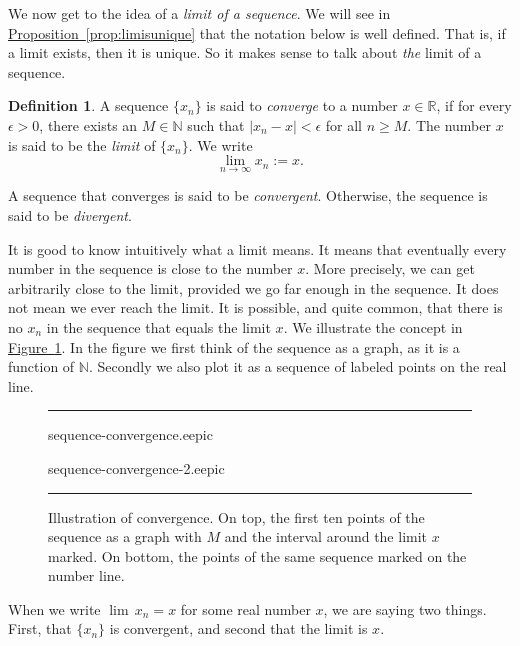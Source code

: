 \documentclass[12pt]{book}
\newenvironment{myfigureht}{%
\begin{figure}[h!t]
\noindent\rule{\textwidth}{0.4pt}\vspace{12pt}\par\centering}%
{\par\noindent\rule{\textwidth}{0.4pt}
\end{figure}}
\newcommand{\abs}[1]{\left\lvert {#1} \right\rvert}
\newcommand{\R}{{\mathbb{R}}}
\newcommand{\N}{{\mathbb{N}}}
\newcommand{\myindex}[1]{#1\index{#1}}
\theoremstyle{plain}
\theoremstyle{remark}
\theoremstyle{definition}
\newtheorem{defn}[thm]{Definition}
\theoremstyle{exercise}
\theoremstyle{example}
\newcommand{\figureref}[1]{\hyperref[#1]{Figure~\ref*{#1}}}
\newcommand{\propref}[1]{\hyperref[#1]{Proposition~\ref*{#1}}}
\begin{document}
We now get to the idea of a \emph{\myindex{limit of a sequence}}.  We will
see in \propref{prop:limisunique}
that the notation below is well defined.  That is, if a limit exists, then
it is unique.  So it makes sense to talk about \emph{the} limit of a sequence.

\begin{defn}
A sequence $\{ x_n \}$ is said to \emph{\myindex{converge}} to a number
$x \in \R$, if for every $\epsilon > 0$, there exists an $M \in \N$ such
that $\abs{x_n - x} < \epsilon$ for all $n \geq M$.  The number $x$
is said to be the \emph{limit} of $\{ x_n \}$.  We write
\begin{equation*}
\lim_{n\to \infty} x_n := x .
\end{equation*}

A sequence
that converges is said to be \emph{convergent}.
Otherwise, the sequence is said to be
\emph{divergent}.
\end{defn}

It is good to know intuitively what a limit means.  It means that eventually
every number in the sequence is close to the number $x$.  More precisely,
we can get arbitrarily close to the limit, provided we go far enough in the
sequence.  It does not mean we ever reach the limit.  It is possible,
and quite common, that there is no $x_n$ in the sequence that equals the
limit $x$.
We illustrate the concept in \figureref{figsequenceconvergence}.  In the
figure we first think of the sequence as a graph, as it is a function of
$\N$.   Secondly we also plot it as a sequence of labeled points on the real
line.

\begin{myfigureht}
{sequence-convergence.eepic}

\vspace*{12pt}

\hspace{13pt} {sequence-convergence-2.eepic}
\caption{Illustration of convergence.  On top, the first ten points of the sequence as a graph
with $M$ and the interval around the limit $x$ marked.  On bottom, the points of the same sequence marked on the
number line.\label{figsequenceconvergence}}
\end{myfigureht}

When we write $\lim\, x_n = x$ for some real number $x$, we are saying two
things.  First, that $\{ x_n \}$ is convergent, and second that the limit is
$x$.
\end{document}
